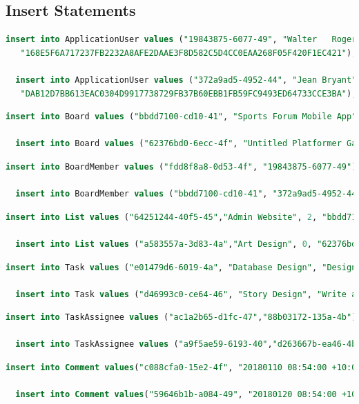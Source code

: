 \documentclass[letterpaper]{article}
\begin{document}
\subsection{Insert Statements}
\begin{lstlisting}[language=SQL, caption=ApplicationUser Insert Statements]
  insert into ApplicationUser values ("19843875-6077-49", "Walter	Rogers",
   "168E5F6A717237FB2232A8AFE2DAAE3F8D582C5D4CC0EAA268F05F420F1EC421");

  insert into ApplicationUser values ("372a9ad5-4952-44", "Jean Bryant",
   "DAB12D7BB613EAC0304D9917738729FB37B60EBB1FB59FC9493ED64733CCE3BA");
\end{lstlisting}
\begin{lstlisting}[language=SQL, caption=Board Insert Statements]
  insert into Board values ("bbdd7100-cd10-41", "Sports Forum Mobile App", "19843875-6077-49");

  insert into Board values ("62376bd0-6ecc-4f", "Untitled Platformer Game", "372a9ad5-4952-44");
\end{lstlisting}
\begin{lstlisting}[language=SQL, caption=BoardMember Insert Statements]
  insert into BoardMember values ("fdd8f8a8-0d53-4f", "19843875-6077-49");

  insert into BoardMember values ("bbdd7100-cd10-41", "372a9ad5-4952-44");
\end{lstlisting}
\begin{lstlisting}[language=SQL, caption=List Insert Statements]
  insert into List values ("64251244-40f5-45","Admin Website", 2, "bbdd7100-cd10-41");

  insert into List values ("a583557a-3d83-4a","Art Design", 0, "62376bd0-6ecc-4f");
\end{lstlisting}
\begin{lstlisting}[language=SQL, caption=Task Insert Statements]
  insert into Task values ("e01479d6-6019-4a", "Database Design", "Design a robust database schema for storing all the data in our app.", "20180120 09:00:00 +10:00", "0e72d679-da23-41");

  insert into Task values ("d46993c0-ce64-46", "Story Design", "Write a fun story for the game.", "20180620 09:00:00 +10:00", "a583557a-3d83-4a");

\end{lstlisting}
\begin{lstlisting}[language=SQL, caption=TaskAssignee Insert Statements]
  insert into TaskAssignee values ("ac1a2b65-d1fc-47","88b03172-135a-4b");

  insert into TaskAssignee values ("a9f5ae59-6193-40","d263667b-ea46-4b");
\end{lstlisting}
\begin{lstlisting}[language=SQL, caption=Comment Insert Statements]
  insert into Comment values("c088cfa0-15e2-4f", "20180110 08:54:00 +10:00", "I'm probably going to need some help with this.", "e01479d6-6019-4a", "372a9ad5-4952-44");

  insert into Comment values("59646b1b-a084-49", "20180120 08:54:00 +10:00", "So I'm thinking our game has a mario-like character - but green.", "a9f5ae59-6193-40", "d263667b-ea46-4b");
\end{lstlisting}
\pagebreak
\end{document}
